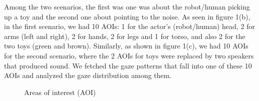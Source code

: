 \documentclass{acm_proc_article-sp}
\begin{document}
Among the two scenarios, the first was one was about the robot/human picking up
a toy and the second one about pointing to the noise. As seen in figure 1(b), in
the first scenario, we had 10 AOIs: 1 for the actor's (robot/human) head, 2 for
arms (left and right), 2 for hands, 2 for legs and 1 for torso, and also 2 for
the two toys (green and brown). Similarly, as shown in figure 1(c), we had 10
AOIs for the second scenario, where the 2 AOIs for toys were replaced by two
speakers that produced sound. We fetched the gaze patterns that fall into one of
these 10 AOIs and analyzed the gaze distribution among them.

\begin{figure}
    \caption{Areas of interest (AOI)}
\end{figure}
\end{document}
